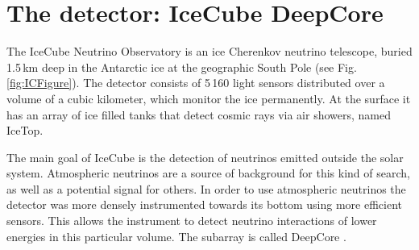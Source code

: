 \documentclass[../Main.tex]{subfiles}
\begin{document}
       {}       {}
    {}    {}
 {} {}


\graphicspath{{figures/}{Detector/figures/}}



\section{The detector: IceCube DeepCore}
\label{sec:detector}
The IceCube Neutrino Observatory \cite{icecube} is an ice Cherenkov neutrino telescope, buried 1.5\,km deep in the Antarctic ice at the geographic South Pole (see Fig.\,\ref{fig:ICFigure}). The detector consists of 5\,160 light sensors distributed over a volume of a cubic kilometer, which monitor the ice permanently. At the surface it has an array of ice filled tanks that detect cosmic rays via air showers, named IceTop.

The main goal of IceCube is the detection of neutrinos emitted outside the solar system. Atmospheric neutrinos are a source of background for this kind of search, as well as a potential signal for others. In order to use atmospheric neutrinos the detector was more densely instrumented towards its bottom using more efficient sensors. This allows the instrument to detect neutrino interactions of lower energies in this particular volume. The subarray is called DeepCore \cite{dcdesign}.
\end{document}
